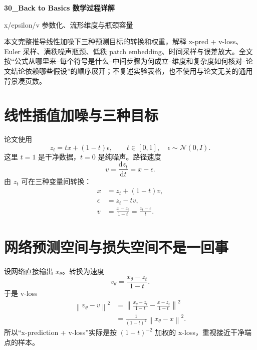 \documentclass[UTF8,12pt,a4paper,fontset=none]{ctexart}
\numberwithin{equation}{section}
\newcommand{\norm}[1]{\left\lVert #1\right\rVert}
\newcommand{\dd}{\mathrm{d}}
\begin{document}
\begin{center}
{\LARGE\bfseries 30\_Back to Basics 数学过程详解}\par
\vspace{0.35em}
{\large x/epsilon/v 参数化、流形维度与瓶颈容量}
\end{center}
\vspace{0.45em}
\begin{keybox}[本文只处理真正需要推导的部分]
本文完整推导线性加噪下三种预测目标的转换和权重，解释 x-pred + v-loss、Euler 采样、满秩噪声瓶颈、低秩 patch embedding、时间采样与误差放大。全文按“公式从哪里来--每个符号是什么--中间步骤为何成立--维度和复杂度如何核对--论文结论依赖哪些假设”的顺序展开；不复述实验表格，也不使用与论文无关的通用背景凑页数。
\end{keybox}
\tableofcontents
\newpage

\section{线性插值加噪与三种目标}
论文使用
\begin{equation}
 z_t=tx+(1-t)\epsilon,
 \qquad t\in[0,1],\quad \epsilon\sim\mathcal N(0,I).
\end{equation}
这里 $t=1$ 是干净数据，$t=0$ 是纯噪声。路径速度
\begin{equation}
 v=\frac{\dd z_t}{\dd t}=x-\epsilon.
\end{equation}
由 $z_t$ 可在三种变量间转换：
\begin{align}
 x&=z_t+(1-t)v,\\
 \epsilon&=z_t-tv,\\
 v&=\frac{x-z_t}{1-t}=\frac{z_t-\epsilon}{t}.
\end{align}

\section{网络预测空间与损失空间不是一回事}
设网络直接输出 $x_\theta$。转换为速度
\begin{equation}
 v_\theta=\frac{x_\theta-z_t}{1-t}.
\end{equation}
于是 v-loss
\begin{align}
 \norm{v_\theta-v}^2
 &=\norm{\frac{x_\theta-z_t}{1-t}-\frac{x-z_t}{1-t}}^2\\
 &=\boxed{\frac{1}{(1-t)^2}\norm{x_\theta-x}^2}.
\end{align}
所以“x-prediction + v-loss”实际是按 $(1-t)^{-2}$ 加权的 x-loss，重视接近干净端点的样本。
\end{document}
